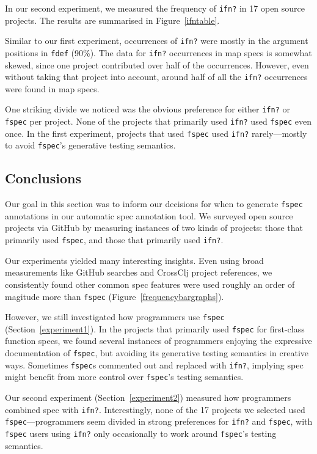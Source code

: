 In our second experiment, we measured the frequency of \texttt{ifn?} in 17 open source projects.
The results are summarised in Figure~\ref{ifntable}.

Similar to our first experiment, occurrences of \texttt{ifn?} were mostly in the argument
positions in \texttt{fdef} (90\%).
The data for \texttt{ifn?} occurrences in map specs is somewhat skewed, since one project
contributed over half of the occurrences. However, even without taking that project into account,
around half of all the \texttt{ifn?} occurrences were found in map specs.

One striking divide we noticed was the obvious preference for either \texttt{ifn?} or \texttt{fspec}
per project. None of the projects that primarily used \texttt{ifn?} used \texttt{fspec} even once.
In the first experiment, projects that used \texttt{fspec} used \texttt{ifn?} rarely---mostly to
avoid \texttt{fspec}'s generative testing semantics.

\subsection{Conclusions}

Our goal in this section was to inform our decisions for when to generate \texttt{fspec}
annotations in our automatic spec annotation tool.
We surveyed open source projects via GitHub by measuring instances of two kinds of projects:
those that primarily used \texttt{fspec}, and those that primarily used \texttt{ifn?}.

Our experiments yielded many interesting insights. Even using broad measurements like
GitHub searches and CrossClj project references,
we consistently found other common spec features were used roughly an order of
magitude more than \texttt{fspec} (Figure~\ref{frequencybargraphs}).

However, we still investigated how programmers use \texttt{fspec} (Section~\ref{experiment1}).
In the projects that primarily used \texttt{fspec} for first-class function specs,
we found several instances of programmers enjoying the expressive documentation
of \texttt{fspec}, but avoiding its generative testing semantics in creative ways.
Sometimes \texttt{fspec}s commented out and replaced with \texttt{ifn?}, implying
spec might benefit from more control over \texttt{fspec}'s testing semantics.

Our second experiment (Section~\ref{experiment2}) measured how programmers combined
spec with \texttt{ifn?}.
Interestingly, none of the 17 projects we selected used \texttt{fspec}---programmers
seem divided in strong preferences for \texttt{ifn?} and \texttt{fspec}, with
\texttt{fspec} users using \texttt{ifn?} only occasionally to work around
\texttt{fspec}'s testing semantics.

